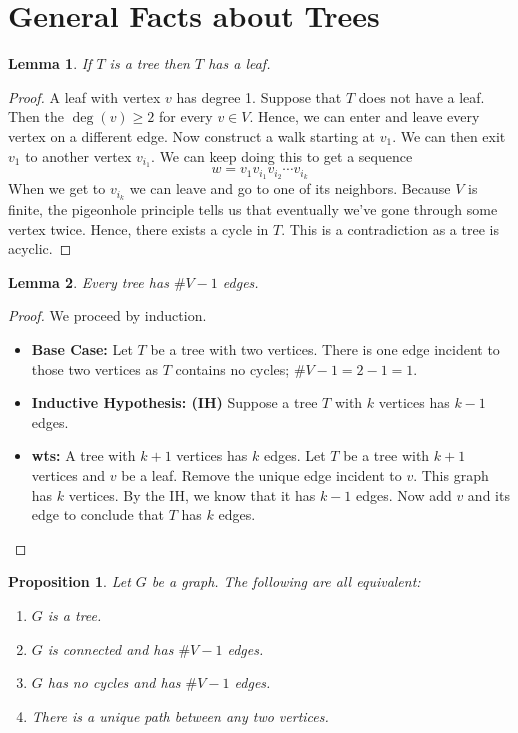 \documentclass[10pt, letterpaper]{article}
\newtheorem{lemma}{Lemma}
\newtheorem{prop}{Proposition}
\theoremstyle{remark}
\theoremstyle{definition}
\begin{document}
\section{General Facts about Trees}

\begin{lemma}
	If $T$ is a tree then $T$ has a leaf.
\end{lemma}

\begin{proof}
	A leaf with vertex $v$ has degree 1. Suppose that $T$ does not have a leaf. Then the $\operatorname{deg}(v) \geq 2$
	for every $v \in V$. Hence, we can enter and leave every vertex on a different edge. Now construct a walk starting
	at $v_1$. We can then exit $v_1$ to another vertex $v_{i_1}$. We can keep doing this to get a sequence
	\[
		w = v_1 v_{i_1} v_{i_2} \cdots v_{i_k}
	\]
	When we get to $v_{i_k}$ we can leave and go to one of its neighbors. Because $V$ is finite, the pigeonhole
	principle tells us that eventually we've gone through some vertex twice. Hence, there exists a cycle in $T$. This
	is a contradiction as a tree is acyclic.
\end{proof}

\begin{lemma}
	Every tree has $\#V-1$ edges.
\end{lemma}

\begin{proof}
	We proceed by induction.

	\begin{itemize}
		\item [] \textbf{Base Case:} Let $T$ be a tree with two vertices. There is one edge incident to those two
		vertices as $T$ contains no cycles; $\# V-1 = 2-1 = 1$.
		\item [] \textbf{Inductive Hypothesis: (IH)} Suppose a tree $T$ with $k$ vertices has $k-1$ edges.
		\item [] \textbf{wts:} A tree with $k+1$ vertices has $k$ edges.
		Let $T$ be a tree with $k+1$ vertices and $v$ be a leaf. Remove the unique edge incident to $v$. This graph
		has $k$ vertices. By the IH, we know that it has $k-1$ edges. Now add $v$ and its edge to conclude that $T$ has
		$k$ edges.
	\end{itemize}
\end{proof}

\begin{prop}
	Let $G$ be a graph. The following are all equivalent:
	\begin{enumerate}
		\item $G$ is a tree.
		\item $G$ is connected and has $\# V-1$ edges.
		\item $G$ has no cycles and has $\# V-1$ edges.
		\item There is a unique path between any two vertices.
	\end{enumerate}
\end{prop}
\end{document}

